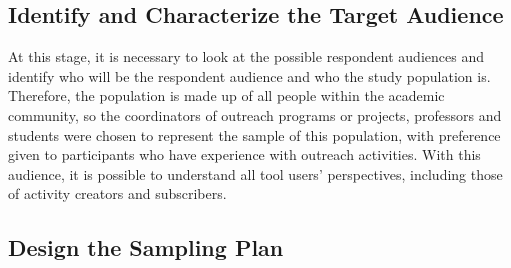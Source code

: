 \subsection{Identify and Characterize the Target Audience} \label{sec:survey-targets}

At this stage, it is necessary to look at the possible respondent audiences and identify who will be the respondent audience and who the study population is.
Therefore, the population is made up of all people within the academic community, so the coordinators of outreach programs or projects, professors and students were chosen to represent the sample of this population, with preference given to participants who have experience with outreach activities.
With this audience, it is possible to understand all tool users' perspectives, including those of activity creators and subscribers.


\subsection{Design the Sampling Plan} \label{sec:survey-sampling}

